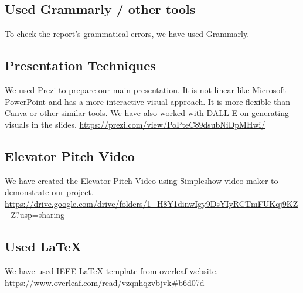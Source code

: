 \documentclass[conference]{IEEEtran}
\begin{document}
\subsection{Used Grammarly / other tools}
To check the report's grammatical errors, we have used Grammarly.

\subsection{Presentation Techniques}
We used Prezi to prepare our main presentation. It is not linear like Microsoft PowerPoint and has a more interactive visual approach. It is more flexible than Canva or other similar tools. We have also worked with DALL-E on generating visuals in the slides.
\url{https://prezi.com/view/PoPteC89dsubNiDpMHwi/}

\subsection{Elevator Pitch Video}
We have created the Elevator Pitch Video using Simpleshow video maker to demonstrate our project.
\url{https://drive.google.com/drive/folders/1_H8Y1dinwIgy9DsYIyRCTmFUKqj9KZ_Z?usp=sharing}



\subsection{Used LaTeX}
We have used IEEE LaTeX template from overleaf website.
\url{https://www.overleaf.com/read/vzqnhqzvbjvk#b6d07d}
\end{document}
